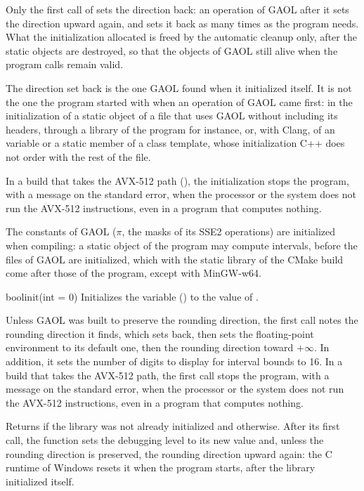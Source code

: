 \medskip
Only the first call of  sets the direction back: an operation
of GAOL after it sets the direction upward again, and
 sets it back as many times as the program
needs.\newinvfive{} What the initialization allocated is freed by the
automatic cleanup only, after the static objects are destroyed, so that the
objects of GAOL still alive when the program calls  remain
valid.

\medskip
The direction set back is the one GAOL found when it initialized itself. It
is not the one the program started with when an operation of GAOL came
first: in the initialization of a static object of a file that uses GAOL
without including its headers, through a library of the program for
instance, or, with Clang, of an  variable or a static member of
a class template, whose initialization C++ does not order with the rest of
the file.

\medskip
In a build that takes the AVX-512 path (), the
initialization stops the program, with a message on the standard error, when
the processor or the system does not run the AVX-512 instructions, even in a
program that computes nothing.\newinvfive

\medskip
The constants of GAOL ($\pi$, the masks of its SSE2 operations) are
initialized when compiling: a static object of the program may compute
intervals, before the files of GAOL are initialized, which with the static
library of the CMake build come after those of the program, except with
MinGW-w64.\newinvfive

\begin{deffun}{bool}{init}{(int  = 0)}
Initializes the variable  ()
to the value of .

Unless GAOL was built to preserve the rounding direction, the first call notes
the rounding direction it finds, which  sets back, then sets
the floating-point environment to its default one, then the rounding
direction toward $+\infty$. In addition, it sets the number of digits to
display for interval bounds to 16. In a build that takes the AVX-512 path,
the first call stops the program, with a message on the standard error, when
the processor or the system does not run the AVX-512 instructions, even in a
program that computes nothing.\newinvfive

Returns  if the library was not already initialized and
 otherwise. After its first call, the function sets the debugging
level to its new value and, unless the rounding direction is preserved, the
rounding direction upward again: the C runtime of Windows resets it when the
program starts, after the library initialized itself.
\end{deffun}

